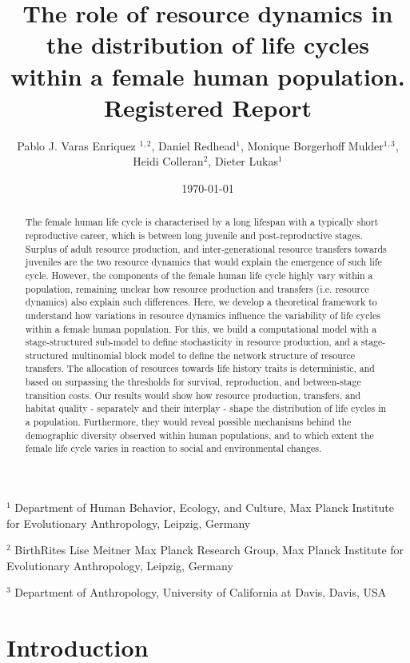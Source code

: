 \documentclass{article}
\title{The role of resource dynamics in the distribution of life cycles within a female human population.
\\
Registered Report
}
\author{Pablo J. Varas Enriquez $^{1,2}$, Daniel Redhead$^{1}$, Monique Borgerhoff Mulder$^{1,3}$, 
\\
Heidi Colleran$^{2}$, Dieter Lukas$^{1}$}
\date{\today}
\begin{document}
\maketitle

$^1$ Department of Human Behavior, Ecology, and Culture, Max Planck Institute for Evolutionary Anthropology, Leipzig, Germany

$^2$ BirthRites Lise Meitner Max Planck Research Group, Max Planck Institute for Evolutionary Anthropology, Leipzig, Germany

$^3$ Department of Anthropology, University of California at Davis, Davis, USA

\tableofcontents

\begin{abstract}
    The female human life cycle is characterised by a long lifespan with a typically short reproductive career, which is between long juvenile and post-reproductive stages. Surplus of adult resource production, and inter-generational resource transfers towards juveniles are the two resource dynamics that would explain the emergence of such life cycle. However, the components of the female human life cycle highly vary within a population, remaining unclear how resource production and transfers (i.e. resource dynamics) also explain such differences. Here, we develop a theoretical framework to understand how variations in resource dynamics influence the variability of life cycles within a female human population. For this, we build a computational model with a stage-structured sub-model to define stochasticity in resource production, and a stage-structured multinomial block model to define the network structure of resource transfers. The allocation of resources towards life history traits is deterministic, and based on surpassing the thresholds for survival, reproduction, and between-stage transition costs. Our results would show how resource production, transfers, and habitat quality - separately and their interplay - shape the distribution of life cycles in a population. Furthermore, they would reveal possible mechanisms behind the demographic diversity observed within human populations, and to which extent the female life cycle varies in reaction to social and environmental changes.
\end{abstract}

\section{Introduction}
\end{document}
